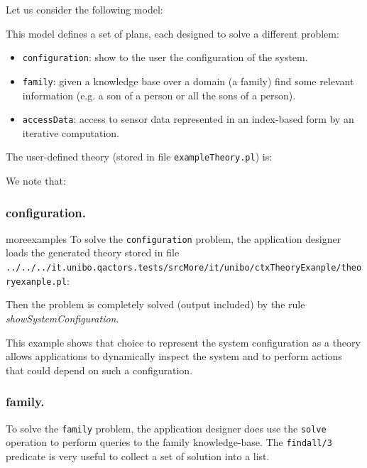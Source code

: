 Let us consider the following model:

  

This model defines a set of plans, each designed to solve a different problem:

\begin{itemize}
\item \texttt{configuration}: show to the user the configuration of the system.
\item \texttt{family}: given a knowledge base over a domain (a family) find some relevant information (e.g. a son of a person or all the sons of a person).
\item \texttt{accessData}: access to sensor data represented in an index-based form by an iterative computation.
\end{itemize}

The user-defined theory (stored in file \texttt{exampleTheory.pl}) is:

  

We note that:
\subsubsection{configuration.}
moreexamples
To solve the \texttt{configuration} problem, the application designer loads the generated theory stored in file
 \texttt{../../../it.unibo.qactors.tests/srcMore/it/unibo/ctxTheoryExanple/theoryexanple.pl}:


 
Then the problem is completely solved (output included) by the \tuprolog{} rule \textit{showSystemConfiguration}.

This example shows that choice to represent the system configuration as a theory allows applications to dynamically inspect the system and to perform actions that could depend on such a configuration.

\subsubsection{family.}
To solve the \texttt{family} problem, the application designer does use the \texttt{solve} operation to perform queries to the family knowledge-base. The \texttt{findall/3} predicate is very useful to collect a set of solution into a list.

